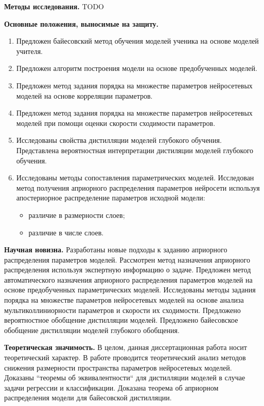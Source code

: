 \vspace{0.5cm}
\textbf{Методы исследования.} TODO

\vspace{0.5cm}
\textbf{Основные положения, выносимые на защиту.}
\vspace{0.3cm}
\begin{enumerate}
    \item Предложен байесовский метод обучения моделей ученика на основе моделей учителя.
    \item Предложен алгоритм построения модели на основе предобученных моделей.
    \item Предложен метод задания порядка на множестве параметров нейросетевых моделей на основе корреляции параметров.
    \item Предложен метод задания порядка на множестве параметров нейросетевых моделей при помощи оценки скорости сходимости параметров.
    \item Исследованы свойства дистилляции моделей глубокого обучения. Представлена вероятностная интерпретации дистиляции моделей глубокого обучения.
    \item Исследованы методы сопоставления параметрических моделей. Исследован метод получения априорного распределения параметров нейросети используя апостериорное распределение параметров исходной модели:
    \begin{itemize}
        \item различие в размерности слоев;
        \item различие в числе слоев.
    \end{itemize}
\end{enumerate}

\vspace{0.5cm}
\textbf{Научная новизна.} Разработаны новые подходы к заданию априорного распределения параметров моделей. Рассмотрен метод назначения априорного распределения используя экспертную информацию о задаче. Предложен метод автоматического назначения априорного распределения параметров моделей на основе предобученных параметрических моделей. Исследованы методы задания порядка на множестве параметров нейросетевых моделей на основе анализа мультиколлиниорности параметров и скорости их сходимости. Предложено вероятностное обобщение дистилляции моделей. Предложено байесовское обобщение дистилляции моделей глубокого обобщения.

\vspace{0.5cm}
\textbf{Теоретическая значимость.} В целом, данная диссертационная работа носит теоретический характер. В работе проводится теоретический анализ методов снижения размерности пространства параметров нейросетевых моделей. Доказаны ``теоремы об эквивалентности`` для дистилляции моделей в случае задачи регрессии и классификации. Доказана теорема об априорном распределения модели для байесовской дистилляции.

